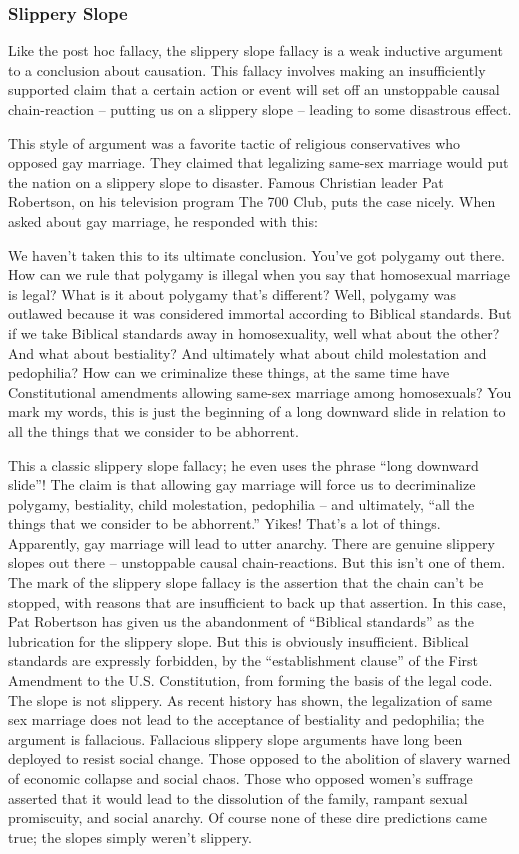 \subsubsection{Slippery Slope}
Like the post hoc fallacy, the slippery slope fallacy is a weak inductive argument to a conclusion
about causation. This fallacy involves making an insufficiently supported claim that a certain
action or event will set off an unstoppable causal chain-reaction -- putting us on a slippery slope --
leading to some disastrous effect.

This style of argument was a favorite tactic of religious conservatives who opposed gay marriage.
They claimed that legalizing same-sex marriage would put the nation on a slippery slope to
disaster. Famous Christian leader Pat Robertson, on his television program The 700 Club, puts the
case nicely. When asked about gay marriage, he responded with this:

We haven't taken this to its ultimate conclusion. You've got polygamy out there. How can
we rule that polygamy is illegal when you say that homosexual marriage is legal? What is
it about polygamy that's different? Well, polygamy was outlawed because it was
considered immortal according to Biblical standards. But if we take Biblical standards
away in homosexuality, well what about the other? And what about bestiality? And
ultimately what about child molestation and pedophilia? How can we criminalize these
things, at the same time have Constitutional amendments allowing same-sex marriage
among homosexuals? You mark my words, this is just the beginning of a long downward
slide in relation to all the things that we consider to be abhorrent.

This a classic slippery slope fallacy; he even uses the phrase ``long downward slide''! The claim is
that allowing gay marriage will force us to decriminalize polygamy, bestiality, child molestation,
pedophilia -- and ultimately, ``all the things that we consider to be abhorrent.'' Yikes! That's a lot
of things. Apparently, gay marriage will lead to utter anarchy.
There are genuine slippery slopes out there -- unstoppable causal chain-reactions. But this isn't one
of them. The mark of the slippery slope fallacy is the assertion that the chain can't be stopped,
with reasons that are insufficient to back up that assertion. In this case, Pat Robertson has given us
the abandonment of ``Biblical standards'' as the lubrication for the slippery slope. But this is
obviously insufficient. Biblical standards are expressly forbidden, by the ``establishment clause''
of the First Amendment to the U.S. Constitution, from forming the basis of the legal code. The
slope is not slippery. As recent history has shown, the legalization of same sex marriage does not
lead to the acceptance of bestiality and pedophilia; the argument is fallacious.
Fallacious slippery slope arguments have long been deployed to resist social change. Those
opposed to the abolition of slavery warned of economic collapse and social chaos. Those who
opposed women's suffrage asserted that it would lead to the dissolution of the family, rampant
sexual promiscuity, and social anarchy. Of course none of these dire predictions came true; the
slopes simply weren't slippery.

